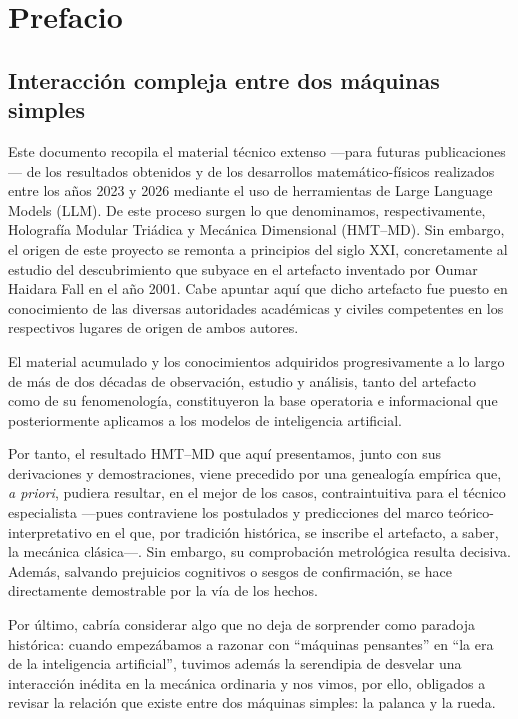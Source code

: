 \chapter*{Prefacio}

\section*{Interacción compleja entre dos máquinas simples}
{}

Este documento recopila el material técnico extenso —para futuras publicaciones— de los resultados obtenidos y de los desarrollos matemático-físicos realizados entre los años 2023 y 2026 mediante el uso de herramientas de Large Language Models (LLM). De este proceso surgen lo que denominamos, respectivamente, Holografía Modular Triádica y Mecánica Dimensional (HMT–MD). Sin embargo, el origen de este proyecto se remonta a principios del siglo XXI, concretamente al estudio del descubrimiento que subyace en el artefacto inventado por Oumar Haidara Fall en el año 2001. Cabe apuntar aquí que dicho artefacto fue puesto en conocimiento de las diversas autoridades académicas y civiles competentes en los respectivos lugares de origen de ambos autores.

El material acumulado y los conocimientos adquiridos progresivamente a lo largo de más de dos décadas de observación, estudio y análisis, tanto del artefacto como de su fenomenología, constituyeron la base operatoria e informacional que posteriormente aplicamos a los modelos de inteligencia artificial.

Por tanto, el resultado HMT–MD que aquí presentamos, junto con sus derivaciones y demostraciones, viene precedido por una genealogía empírica que, \textit{a priori}, pudiera resultar, en el mejor de los casos, contraintuitiva para el técnico especialista —pues contraviene los postulados y predicciones del marco teórico-interpretativo en el que, por tradición histórica, se inscribe el artefacto, a saber, la mecánica clásica—. Sin embargo, su comprobación metrológica resulta decisiva. Además, salvando prejuicios cognitivos o sesgos de confirmación, se hace directamente demostrable por la vía de los hechos.

Por último, cabría considerar algo que no deja de sorprender como paradoja histórica: cuando empezábamos a razonar con “máquinas pensantes” en “la era de la inteligencia artificial”, tuvimos además la serendipia de desvelar una interacción inédita en la mecánica ordinaria y nos vimos, por ello, obligados a revisar la relación que existe entre dos máquinas simples: la palanca y la rueda.
